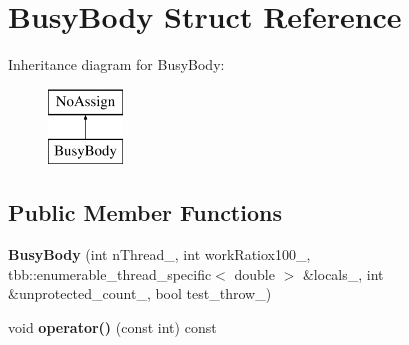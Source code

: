 \hypertarget{structBusyBody}{}\section{Busy\+Body Struct Reference}
\label{structBusyBody}
Inheritance diagram for Busy\+Body\+:\begin{figure}[H]
\begin{center}
\leavevmode
\includegraphics[height=2.000000cm]{structBusyBody}
\end{center}
\end{figure}
\subsection*{Public Member Functions}
\begin{DoxyCompactItemize}
\item 
\hypertarget{structBusyBody_af37d3a0b7e6acb9150b51d2f4194f388}{}{\bfseries Busy\+Body} (int n\+Thread\+\_\+, int work\+Ratiox100\+\_\+, tbb\+::enumerable\+\_\+thread\+\_\+specific$<$ double $>$ \&locals\+\_\+, int \&unprotected\+\_\+count\+\_\+, bool test\+\_\+throw\+\_\+)\label{structBusyBody_af37d3a0b7e6acb9150b51d2f4194f388}

\item 
\hypertarget{structBusyBody_a1f0c0791fe65d302502c5ad56abc70b9}{}void {\bfseries operator()} (const int) const \label{structBusyBody_a1f0c0791fe65d302502c5ad56abc70b9}

\end{DoxyCompactItemize}
